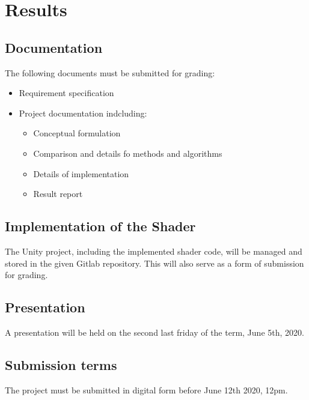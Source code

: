 \section{Results}

\subsection{Documentation}
The following documents must be submitted for grading:
\begin{itemize}
    \item Requirement specification
    \item Project documentation indcluding:
    \begin{itemize}
        \item Conceptual formulation
        \item Comparison and details fo methods and algorithms
        \item Details of implementation
        \item Result report
    \end{itemize}
\end{itemize}

\subsection{Implementation of the Shader}
The Unity project, including the implemented shader code, will be managed and stored in the given Gitlab repository\cite{gitlab}. This will also serve as a form of submission for grading.

\subsection{Presentation}
A presentation will be held on the second last friday of the term, June 5th, 2020.

\subsection{Submission terms}
The project must be submitted in digital form before June 12th 2020, 12pm.
